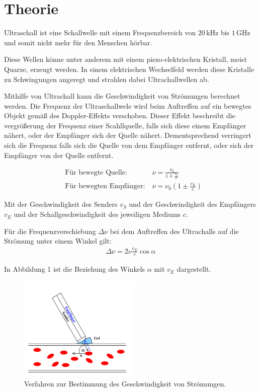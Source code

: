 \section{Theorie}
\label{sec:Theorie}

Ultraschall ist eine Schallwelle mit einem Frequenzbereich von $20\,$kHz bis $1\,$GHz und somit nicht mehr für den
Menschen hörbar.

Diese Wellen könne unter anderem mit einem piezo-elektrischen Kristall, meist Quarze, erzeugt werden. In einem elektrischen Wechselfeld werden
diese Kristalle zu Schwingungen angeregt und strahlen dabei Ultrachallwellen ab.

Mithilfe von Ultrachall kann die Geschwindigkeit von Strömungen berechnet werden. Die Frequenz der Ultraschallwele wird beim Auftreffen auf ein bewegtes Objekt
gemäß des Doppler-Effekts verschoben. Dieser Effekt beschreibt die vergrößerung der Frequenz einer Scahllquelle, falls sich diese einem Empfänger nähert, oder der
Empfänger sich der Quelle nähert. Dementsprechend verringert sich die Frequenz falls sich die Quelle von dem Empfänger entfernt, oder sich
der Empfänger von der Quelle entfernt.

\begin{align}
  &\text{Für bewegte Quelle:} \: &\nu = \frac{\nu_0}{1 \mp \frac{v_S}{c}} \\
  &\text{Für bewegten Empfänger:} \: &\nu = \nu_0 \left(1 \pm \frac{v_E}{c}  \right)
\end{align}

Mit der Geschwindigkeit des Senders $v_S$ und der Geschwindigkeit des Empfängers $v_E$ und der Schallgeschwindigkeit des jeweiligen Mediums $c$.

Für die Frequenzverschiebung $\Delta \nu$ bei dem Auftreffen des Ultrachalls auf die Strömung unter einem Winkel gilt:
\begin{align}
  \Delta \nu = 2\nu \frac{v_E}{c}\cos{\alpha}
\end{align}

In Abbildung 1 ist die Beziehung des Winkels $\alpha$ mit $v_E$ dargestellt.

\begin{figure}[H]
  \centering
  \includegraphics[height=5cm]{winkel.PNG}
  \caption{Verfahren zur Bestimmung des Geschwindigkeit von Strömungen. \cite{sample}}
  \label{fig:Linienspektrum}
\end{figure}
